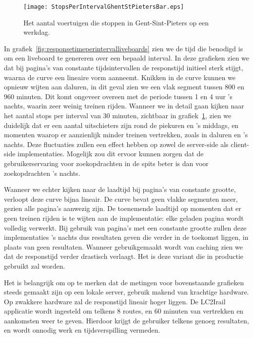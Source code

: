 \begin{figure}[h]
	\centering
	\texttt{[image: StopsPerIntervalGhentStPietersBar.eps]}
	\caption[Het aantal voertuigen die stoppen in Gent-St-Pieters]{Het aantal voertuigen die stoppen in Gent-Sint-Pieters op een werkdag.}
	\label{fig:stopsperintervaldetail}
\end{figure}

In grafiek~\ref{fig:responsetimeperintervalliveboards} zien we de tijd die benodigd is om een liveboard te genereren over een bepaald interval. In deze grafieken zien we dat bij pagina's van constante tijdsintervallen de responstijd initieel sterk stijgt, waarna de curve een lineaire vorm aanneemt. Knikken in de curve kunnen we opnieuw wijten aan daluren, in dit geval zien we een vlak segment tussen 800 en 960 minuten. Dit komt ongeveer overeen met de periode tussen 1 en 4 uur 's nachts, waarin zeer weinig treinen rijden. Wanneer we in detail gaan kijken naar het aantal stops per interval van 30 minuten, zichtbaar in grafiek~\ref{fig:stopsperintervaldetail}, zien we duidelijk dat er een aantal uitschieters zijn rond de piekuren en 's middags, en momenten waarop er aanzienlijk minder treinen vertrekken, zoals in daluren en 's nachts. Deze fluctuaties zullen een effect hebben op zowel de server-side als client-side implementaties. Mogelijk zou dit ervoor kunnen zorgen dat de gebruikerservaring voor zoekopdrachten in de spits beter is dan voor zoekopdrachten 's nachts.

Wanneer we echter kijken naar de laadtijd bij pagina's van constante grootte, verloopt deze curve bijna lineair. De curve bevat geen vlakke segmenten meer, gezien alle pagina's aanwezig zijn. De toenemende laadtijd op momenten dat er geen treinen rijden is te wijten aan de implementatie: elke geladen pagina wordt volledig verwerkt. Bij gebruik van pagina's met een constante grootte zullen deze implementaties 's nachts dus resultaten geven die verder in de toekomst liggen, in plaats van geen resultaten. Wanneer gebruikgemaakt wordt van caching zien we dat de responstijd verder drastisch verlaagt. Het is deze variant die in productie gebruikt zal worden. 

Het is belangrijk om op te merken dat de metingen voor bovenstaande grafieken steeds gemaakt zijn op een lokale server, gebruik makend van krachtige hardware. Op zwakkere hardware zal de responstijd lineair hoger liggen. De LC2Irail applicatie wordt ingesteld om telkens 8 routes, en 60 minuten van vertrekken en aankomsten weer te geven. Hierdoor krijgt de gebruiker telkens genoeg resultaten, en wordt onnodig werk en tijdsverspilling vermeden.

